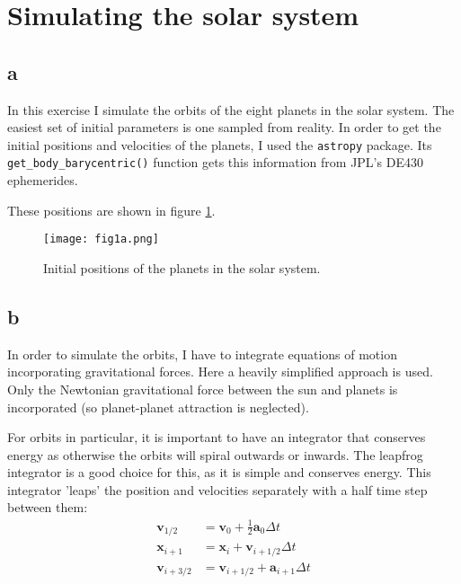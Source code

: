 \section{Simulating the solar system}



\subsection*{a}
In this exercise I simulate the orbits of the eight planets in the solar system.
The easiest set of initial parameters is one sampled from reality.
In order to get the initial positions and velocities of the planets, I used the \texttt{astropy} package.
Its \texttt{get\_body\_barycentric()} function gets this information from JPL's DE430 ephemerides. %

These positions are shown in figure \ref{fig:initial_positions}.

\begin{figure}
    \centering
    \texttt{[image: fig1a.png]}
    \caption{Initial positions of the planets in the solar system.}
    \label{fig:initial_positions}
\end{figure}




\subsection*{b}
In order to simulate the orbits, I have to integrate equations of motion incorporating gravitational forces.
Here a heavily simplified approach is used.
Only the Newtonian gravitational force between the sun and planets is incorporated (so planet-planet attraction is neglected).

For orbits in particular, it is important to have an integrator that conserves energy as otherwise the orbits will spiral outwards or inwards.
The leapfrog integrator is a good choice for this, as it is simple and conserves energy.
This integrator 'leaps' the position and velocities separately with a half time step between them:
\begin{align}
    \mathbf{v}_{1/2} &= \mathbf{v}_0 + \frac{1}{2} \mathbf{a}_0 \Delta t \\
    \mathbf{x}_{i+1} &= \mathbf{x}_i + \mathbf{v}_{i+1/2} \Delta t \\
    \mathbf{v}_{i+3/2} &= \mathbf{v}_{i+1/2} + \mathbf{a}_{i+1} \Delta t
\end{align}

